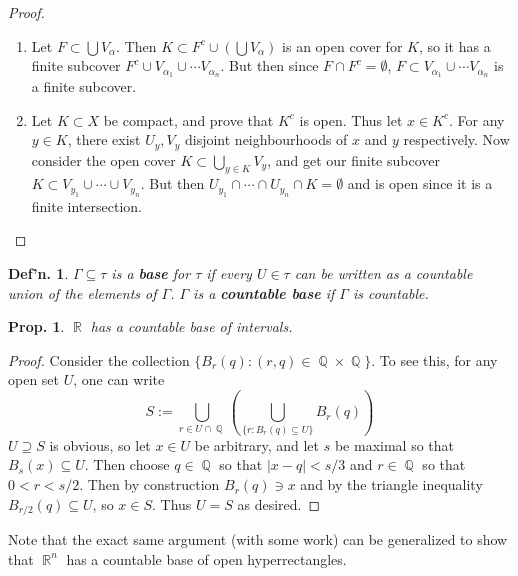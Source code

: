\documentclass[12pt, a4paper]{book}
\DeclareMathOperator{\Q}{\mathbb{Q}}
\DeclareMathOperator{\R}{\mathbb{R}}
\newtheorem{definition}[theorem]{Def'n.}
\newtheorem{proposition}[theorem]{Prop.}
\theoremstyle{nonumberplain}
\newtheorem{proof}{Proof}
\begin{document}
\begin{proof}
    \begin{enumerate}[nolistsep]
        \item Let $F\subset\bigcup V_\alpha$.
            Then $K\subset F^c\cup \left(\bigcup V_\alpha\right)$ is an open cover for $K$, so it has a finite subcover $F^c\cup V_{\alpha_1}\cup\cdots V_{\alpha_n}$.
            But then since $F\cap F^c=\emptyset$, $F\subset V_{\alpha_1}\cup\cdots V_{\alpha_n}$ is a finite subcover.
        \item Let $K\subset X$ be compact, and prove that $K^c$ is open.
            Thus let $x\in K^c$.
            For any $y\in K$, there exist $U_y,V_y$ disjoint neighbourhoods of $x$ and $y$ respectively.
            Now consider the open cover $K\subset\bigcup_{y\in K}V_y$, and get our finite subcover $K\subset V_{y_1}\cup\cdots\cup V_{y_n}$.
            But then $U_{y_1}\cap\cdots\cap U_{y_n}\cap K=\emptyset$ and is open since it is a finite intersection.
    \end{enumerate}
\end{proof}
\begin{definition}
    $\Gamma\subseteq\tau$ is a \textbf{base} for $\tau$ if every $U\in\tau$ can be written as a countable union of the elements of $\Gamma$.
    $\Gamma$ is a \textbf{countable base} if $\Gamma$ is countable.
\end{definition}
\begin{proposition}
    $\R$ has a countable base of intervals.
\end{proposition}
\begin{proof}
    Consider the collection $\{B_{r}(q):(r,q)\in\Q\times\Q\}$.
    To see this, for any open set $U$, one can write
    \[S:=\bigcup\limits_{r\in U\cap\Q} \left(\bigcup\limits_{\{r:B_{r}(q)\subseteq U\}}B_{r}(q)\right)\]
    $U\supseteq S$ is obvious, so let $x\in U$ be arbitrary, and let $s$ be maximal so that $B_s(x)\subseteq U$.
    Then choose $q\in\Q$ so that $|x-q|<s/3$ and $r\in\Q$ so that $0<r<s/2$.
    Then by construction $B_{r}(q)\ni x$ and by the triangle inequality $B_{r/2}(q)\subseteq U$, so $x\in S$.
    Thus $U=S$ as desired.
\end{proof}
Note that the exact same argument (with some work) can be generalized to show that $\R^n$ has a countable base of open hyperrectangles.
\end{document}
